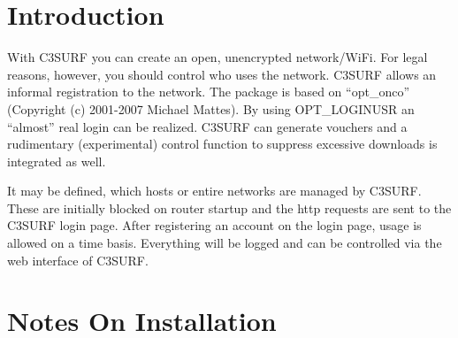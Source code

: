 \section{Introduction}

With C3SURF you can create an open, unencrypted network/WiFi. For legal reasons,
however, you should control who uses the network. C3SURF allows an informal
registration to the network. The package is based on ``opt\_onco'' (Copyright
(c) 2001-2007 Michael Mattes). By using OPT\_LOGINUSR an ``almost'' real login
can be realized. C3SURF can generate vouchers and a rudimentary (experimental)
control function to suppress excessive downloads is integrated as well.

It may be defined, which hosts or entire networks are managed by C3SURF. These
are initially blocked on router startup and the http requests are sent to the C3SURF
login page. After registering an account on the login page, usage is allowed on a time basis.
Everything will be logged and can be controlled via the web interface of C3SURF.

\section {Notes On Installation}

